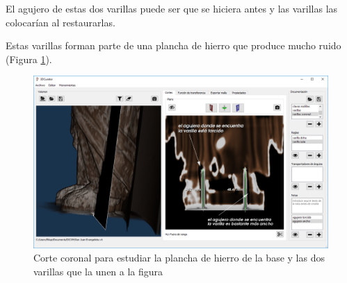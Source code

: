 El agujero de estas dos varillas puede ser que se hiciera antes y las varillas las colocarían al restaurarlas. 

Estas varillas forman parte de una plancha de hierro que produce mucho ruido (Figura \ref{fig:resultados/documentacion/san-juan-evangelista/varillas-coronal}). 

\begin{figure}[H]
	\centering
	\includegraphics[width=12.5cm]{imagenes/resultados/documentacion/san-juan-evangelista/varillas-coronal}
	\caption{Corte coronal para estudiar la plancha de hierro de la base y las dos varillas que la unen a la figura}
	\label{fig:resultados/documentacion/san-juan-evangelista/varillas-coronal}
\end{figure} 
